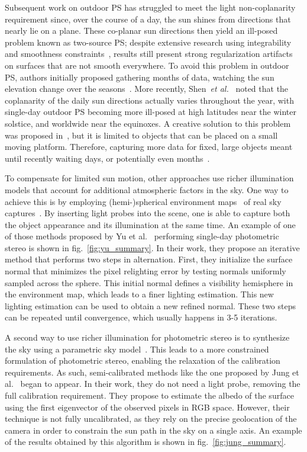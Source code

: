 Subsequent work on outdoor PS has struggled to meet the light non-coplanarity requirement since, over the course of a day, the sun shines from directions that nearly lie on a plane. These co-planar sun directions then yield an ill-posed problem known as two-source PS; despite extensive research using integrability and smoothness constraints~\cite{onn-ijcv-90,hernandez-pami-11}, results still present strong regularization artifacts on surfaces that are not smooth everywhere. To avoid this problem in outdoor PS, authors initially proposed gathering months of data, watching the sun elevation change over the seasons~\cite{abrams-eccv-12,ackermann-cvpr-12}. More recently, Shen~{\em et al.}~\cite{shen-pg-14} noted that the coplanarity of the daily sun directions actually varies throughout the year, with single-day outdoor PS becoming more ill-posed at high latitudes near the winter solstice, and worldwide near the equinoxes. A creative solution to this problem was proposed in~\cite{hung-wacv-15}, but it is limited to objects that can be placed on a small moving platform. Therefore, capturing more data for fixed, large objects meant until recently waiting days, or potentially even months~\cite{ackermann-cvpr-12,abrams-eccv-12}. 


To compensate for limited sun motion, other approaches use richer illumination models that account for additional atmospheric factors in the sky. One way to achieve this is by employing \mbox{(hemi-)spherical} environment maps~\cite{debevec-siggraph-98} of real sky captures~\cite{yu-iccp-13,shi-3dv-14,hung-wacv-15}. By inserting light probes into the scene, one is able to capture both the object appearance and its illumination at the same time. An example of one of those methods proposed by Yu et al.~\cite{yu-iccp-13} performing single-day photometric stereo is shown in fig.~\ref{fig:yu_summary}. In their work, they propose an iterative method that performs two steps in alternation. First, they initialize the surface normal that minimizes the pixel relighting error by testing normals uniformly sampled across the sphere. This initial normal defines a visibility hemisphere in the environment map, which leads to a finer lighting estimation. This new lighting estimation can be used to obtain a new refined normal. These two steps can be repeated until convergence, which usually happens in 3-5 iterations. 

A second way to use richer illumination for photometric stereo is to synthesize the sky using a parametric sky model~\cite{inose-tcva-13,jung-cvpr-15}. This leads to a more constrained formulation of photometric stereo, enabling the relaxation of the calibration requirements. As such, semi-calibrated methods like the one proposed by Jung et al.~\cite{jung-cvpr-15} began to appear. In their work, they do not need a light probe, removing the full calibration requirement. They propose to estimate the albedo of the surface using the first eigenvector of the observed pixels in RGB space. However, their technique is not fully uncalibrated, as they rely on the precise geolocation of the camera in order to constrain the sun path in the sky on a single axis. An example of the results obtained by this algorithm is shown in fig.~\ref{fig:jung_summary}.


